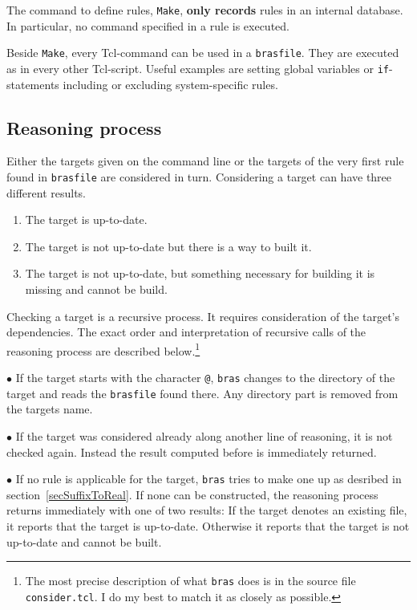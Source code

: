 \documentclass[11pt,bibtotoc,idxtotoc]{scrreprt}
\makeatletter
\newcommand{\bras}{\texttt{bras}}
\newcommand{\Indextt}[1]{\texttt{#1}\index{#1@\texttt{#1}}}
\makeatother
\begin{document}
The command to define rules, \texttt{Make}, \textbf{only records}
rules in an internal database. In particular, no command specified in
a rule is executed.

Beside \texttt{Make}, every Tcl-command can be used in a
\texttt{brasfile}. They are executed as in every other Tcl-script.
Useful examples are setting global variables or \texttt{if}-statements
including or excluding system-specific rules.

\subsection{Reasoning process}
\label{secReasoning}
Either the targets given on the command line or the targets of the
very first rule found in \texttt{brasfile} are considered in
turn. Considering a target can have three different results. 
\begin{enumerate}
\item
The target is up-to-date.
\item
The target is not up-to-date but there is a way to built it.
\item
The target is not up-to-date, but something necessary for building it
is missing and cannot be build.
\end{enumerate}
Checking a target is a recursive process. It requires consideration of
the target's dependencies. The exact order and interpretation of
recursive calls of the reasoning process are described
below.\footnote{The most precise description of what \bras{} does is
  in the source file \Indextt{consider.tcl}. I do my best to match it
  as closely as possible.}

$\bullet$ If the target starts with the character \Indextt{@}, \bras{}
changes to the directory of the target and reads the \texttt{brasfile}
found there. Any directory part is removed from the targets name.

$\bullet$ If the target was considered already along another line of
reasoning, it is not checked again. Instead the result computed before
is immediately returned.

$\bullet$ If no rule is applicable for the target, \bras{} tries to
make one up as desribed in section~\ref{secSuffixToReal}. If none can be
constructed, the reasoning process returns immediately with one of two
results: If the target denotes an existing file, it reports that the
target is up-to-date. Otherwise it reports that the target is not
up-to-date and cannot be built.
\end{document}
